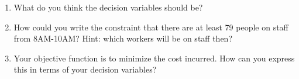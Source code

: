 \documentclass[twoside]{article}%
\begin{document}
\begin{enumerate}
 
\item What do you think the decision variables should be?

\item How could you write the constraint that there are at least 79 people on staff from 8AM-10AM? Hint:
which workers will be on staff then?
\item
Your objective function is to minimize the cost incurred. 
How can you express this in terms of your decision
variables?

\end{enumerate}
\end{document}
